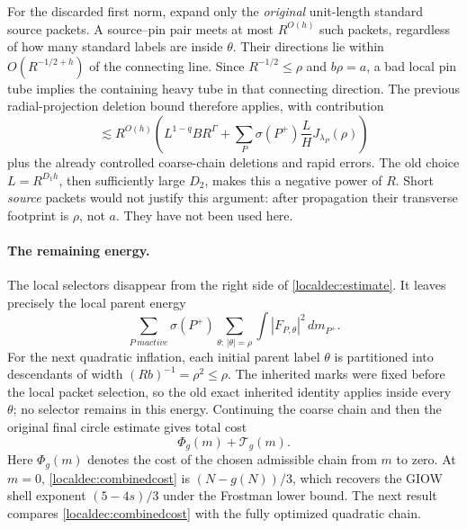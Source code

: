 For the discarded first norm, expand only the \emph{original}
unit-length standard source packets. A source--pin pair meets at most
\(R^{O(h)}\) such packets, regardless of how many standard labels are
inside \(\theta\). Their directions lie within
\(O(R^{-1/2+h})\) of the connecting line. Since
\(R^{-1/2}\le\rho\) and \(b\rho=a\), a bad local pin tube implies
the containing heavy tube in that connecting direction. The previous
radial-projection deletion bound therefore applies, with contribution
\[
 \lesssim R^{O(h)}\left(L^{1-q}BR^\Gamma+
       \sum_P\sigma(P^+)\frac{L}{H}J_{\lambda_P}(\rho)\right)
\]
plus the already controlled coarse-chain deletions and rapid errors.
The old choice \(L=R^{D_1h}\), then sufficiently large \(D_2\), makes
this a negative power of \(R\). Short \emph{source} packets would not
justify this argument: after propagation their transverse footprint
is \(\rho\), not \(a\). They have not been used here.

\paragraph{The remaining energy.}
The local selectors disappear from the right side of
\eqref{localdec:estimate}. It leaves precisely the local parent energy
\[
 \sum_{P\ {
m active}}\sigma(P^+)
 \sum_{\theta:\,|\theta|=\rho}
       \int |F_{P,\theta}|^2\,dm_{P^+}.
\]
For the next quadratic inflation, each initial parent label \(\theta\)
is partitioned into descendants of width
\((Rb)^{-1}=\rho^2\le\rho\). The inherited marks were fixed before
the local packet selection, so the old exact inherited identity applies
inside every \(\theta\); no selector remains in this energy.
Continuing the coarse chain and then the original final circle estimate
gives total cost
\begin{equation}\label{localdec:combinedcost}
 \Phi_g(m)+\mathcal T_g(m).
\end{equation}
Here \(\Phi_g(m)\) denotes the cost of the chosen admissible chain from
\(m\) to zero. At \(m=0\), \eqref{localdec:combinedcost} is
\((N-g(N))/3\), which recovers the GIOW shell exponent
\((5-4s)/3\) under the Frostman lower bound. The next result compares
\eqref{localdec:combinedcost} with the fully optimized quadratic chain.

